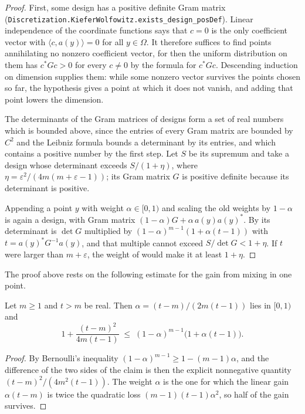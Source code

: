 \begin{proof}
\leanok
{}
First, some design has a positive definite Gram matrix
(\texttt{Discretization.KieferWolfowitz.exists\_design\_posDef}). Linear independence of
the coordinate functions says that $c = 0$ is the only coefficient vector with
$\langle c, a(y) \rangle = 0$ for all $y \in \Omega$. It therefore suffices to find points
annihilating no nonzero coefficient vector, for then the uniform distribution on them has
$c^* G c > 0$ for every $c \neq 0$ by the formula for $c^* G c$. Descending
induction on dimension supplies them: while some nonzero vector survives the points
chosen so far, the hypothesis gives a point at which it does not vanish, and adding that
point lowers the dimension.

The determinants of the Gram matrices of designs form a set of real numbers which is
bounded above, since the entries of every Gram matrix are bounded by $C^2$ and the
Leibniz formula bounds a determinant by its entries, and which contains a positive
number by the first step. Let $S$ be its supremum and take a design whose
determinant exceeds $S / (1 + \eta)$, where
$\eta = \varepsilon^2 / (4m(m + \varepsilon - 1))$; its Gram matrix $G$ is positive
definite because its determinant is positive.

Appending a point $y$ with weight $\alpha \in [0,1)$ and scaling the old weights by
$1 - \alpha$ is again a design, with Gram matrix $(1-\alpha) G + \alpha \, a(y) a(y)^*$.
By  its determinant is $\det G$ multiplied by
$(1-\alpha)^{m-1}(1 + \alpha(t-1))$ with $t = a(y)^* G^{-1} a(y)$, and that multiple
cannot exceed $S / \det G < 1 + \eta$. If $t$ were larger than $m + \varepsilon$, the
weight of  would make it at least $1 + \eta$.
\end{proof}

The proof above rests on the following estimate for the gain from mixing in one point.

\begin{lemma}
\label{lem:mixing-gain}
\leanok
Let $m \geq 1$ and $t > m$ be real. Then $\alpha = (t-m) / (2m(t-1))$ lies in $[0,1)$ and
\[
  1 + \frac{(t-m)^2}{4m(t-1)}
    \; \leq \; (1-\alpha)^{m-1} \bigl( 1 + \alpha (t-1) \bigr).
\]
\end{lemma}

\begin{proof}
\leanok
By Bernoulli's inequality $(1-\alpha)^{m-1} \geq 1 - (m-1)\alpha$, and the difference of
the two sides of the claim is then the explicit nonnegative quantity
$(t-m)^2 / (4m^2(t-1))$. The weight $\alpha$ is the one for which the linear gain
$\alpha(t-m)$ is twice the quadratic loss $(m-1)(t-1)\alpha^2$, so half of the gain
survives.
\end{proof}

